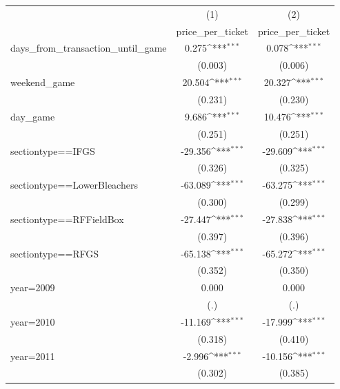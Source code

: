 {
\def\sym#1{\ifmmode^{#1}\else\(^{#1}\)\fi}
\begin{tabular}{l*{2}{c}}
\hline\hline
                    &\multicolumn{1}{c}{(1)}&\multicolumn{1}{c}{(2)}\\
                    &\multicolumn{1}{c}{price\_per\_ticket}&\multicolumn{1}{c}{price\_per\_ticket}\\
\hline
days\_from\_transaction\_until\_game&       0.275\sym{***}&       0.078\sym{***}\\
                    &     (0.003)         &     (0.006)         \\
[1em]
weekend\_game        &      20.504\sym{***}&      20.327\sym{***}\\
                    &     (0.231)         &     (0.230)         \\
[1em]
day\_game            &       9.686\sym{***}&      10.476\sym{***}\\
                    &     (0.251)         &     (0.251)         \\
[1em]
sectiontype==IFGS   &     -29.356\sym{***}&     -29.609\sym{***}\\
                    &     (0.326)         &     (0.325)         \\
[1em]
sectiontype==LowerBleachers&     -63.089\sym{***}&     -63.275\sym{***}\\
                    &     (0.300)         &     (0.299)         \\
[1em]
sectiontype==RFFieldBox&     -27.447\sym{***}&     -27.838\sym{***}\\
                    &     (0.397)         &     (0.396)         \\
[1em]
sectiontype==RFGS   &     -65.138\sym{***}&     -65.272\sym{***}\\
                    &     (0.352)         &     (0.350)         \\
[1em]
year=2009           &       0.000         &       0.000         \\
                    &         (.)         &         (.)         \\
[1em]
year=2010           &     -11.169\sym{***}&     -17.999\sym{***}\\
                    &     (0.318)         &     (0.410)         \\
[1em]
year=2011           &      -2.996\sym{***}&     -10.156\sym{***}\\
                    &     (0.302)         &     (0.385)         \\

\end{tabular}}
